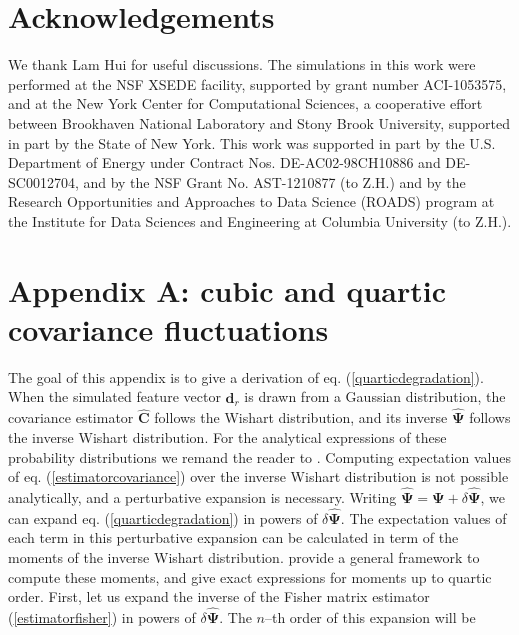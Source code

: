 \documentclass[reprint,aps,prd,superscriptaddress,showkeys,showpacs]{revtex4-1}
\newcommand{\bb}[1]{\mathbf{#1}}
\newcommand{\bbh}[1]{\mathbf{\hat{#1}}}
\begin{document}
 

\section*{Acknowledgements}
We thank Lam Hui for useful discussions.  The simulations in this work
were performed at the NSF XSEDE facility, supported by grant number
ACI-1053575, and at the New York Center for Computational Sciences, a
cooperative effort between Brookhaven National Laboratory and Stony
Brook University, supported in part by the State of New York. This
work was supported in part by the U.S. Department of Energy under
Contract Nos. DE-AC02-98CH10886 and DE-SC0012704, and by the NSF Grant
No. AST-1210877 (to Z.H.) and by the Research Opportunities and
Approaches to Data Science (ROADS) program at the Institute for Data
Sciences and Engineering at Columbia University (to Z.H.).  



\section*{Appendix A: cubic and quartic covariance fluctuations}
\label{appendixA}

The goal of this appendix is to give a derivation of eq. (\ref{quarticdegradation}). When the simulated feature vector $\bbh{d}_r$ is drawn from a Gaussian distribution, the covariance estimator $\bbh{C}$ follows the Wishart distribution, and its inverse $\bbh{\Psi}$ follows the inverse Wishart distribution. For the analytical expressions of these probability distributions we remand the reader to \citep{Taylor12}. Computing expectation values of eq. (\ref{estimatorcovariance}) over the inverse Wishart distribution is not possible analytically, and a perturbative expansion is necessary. Writing $\bbh{\Psi}=\bb{\Psi}+\delta\bbh{\Psi}$, we can expand eq. (\ref{quarticdegradation}) in powers of $\delta\bbh{\Psi}$. The expectation values of each term in this perturbative expansion can be calculated in term of the moments of the inverse Wishart distribution. \citep{MasumotoWishart} provide a general framework to compute these moments, and give exact expressions for moments up to quartic order. First, let us expand the inverse of the Fisher matrix estimator (\ref{estimatorfisher}) in powers of $\delta\bbh{\Psi}$. The $n$--th order of this expansion will be 
\end{document}
